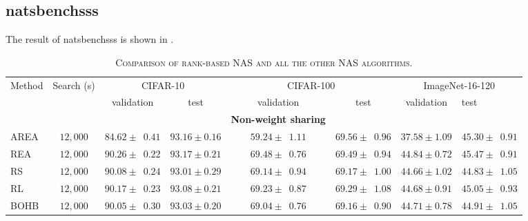 \documentclass[sigconf]{acmart}
\begin{document}
    \subsection*{natsbenchsss}
    The result of natsbenchsss is shown in .
    \begin{table*}[htb]
        \newcommand{\z}{\phantom{0}}
        \caption{\textsc{Comparison of rank-based NAS and all the other NAS algorithms.}}
          \vspace{-\baselineskip}
        \begin{tabular}{@{}lccccccl@{}}\toprule
        Method & Search (s) & \multicolumn{2}{c}{CIFAR-10} & \multicolumn{2}{c}{CIFAR-100} & \multicolumn{2}{c}{ImageNet-16-120} \\ \cmidrule(lr){3-4}\cmidrule(lr){5-6}\cmidrule(lr){7-8}
        & & validation & test & validation & test & validation & test \\ \midrule
        &&&&\textbf{Non-weight sharing}&&&\\
        AREA      & $12,000$ & $84.62 \pm \z{0.41}$                & $93.16 \pm 0.16$               & $59.24 \pm \z{1.11}$                 & $69.56 \pm \z{0.96}$                & $37.58 \pm 1.09$                 & $45.30 \pm \z{0.91}$                \\
        REA       & $12,000$ & $90.26 \pm \z{0.22}$                & $93.17 \pm 0.21$               & $69.48 \pm \z{0.76}$                 & $69.49 \pm \z{0.94}$                & $44.84 \pm 0.72$                 & $45.47 \pm \z{0.91}$                \\
        RS        & $12,000$ & $90.08 \pm \z{0.24}$                & $93.01 \pm 0.29$               & $69.14 \pm \z{0.94}$                 & $69.17 \pm \z{1.00}$                & $44.66 \pm 1.02$                 & $44.83 \pm \z{1.05}$                \\
        RL        & $12,000$ & $90.17 \pm \z{0.23}$                & $93.08 \pm 0.21$               & $69.23 \pm \z{0.87}$                 & $69.29 \pm \z{1.08}$                & $44.68 \pm 0.91$                 & $45.05 \pm \z{0.93}$                \\
        BOHB      & $12,000$ & $90.05 \pm \z{0.30}$                & $93.03 \pm 0.20$               & $69.04 \pm \z{0.76}$                 & $69.16 \pm \z{0.90}$                & $44.71 \pm 0.78$                 & $44.91 \pm \z{1.05}$                \\ \midrule

\end{tabular}
\end{table*}
\end{document}
